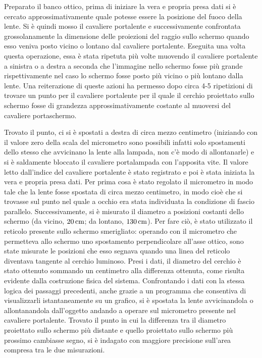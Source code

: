 Preparato il banco 
ottico, prima di iniziare la vera e propria presa dati si è cercato 
approssimativamente quale potesse essere la posizione del fuoco 
della lente. Si è quindi mosso il cavaliere portalente e 
successivamente confrontata grossolanamente la dimensione delle 
proiezioni del raggio sullo schermo quando esso veniva posto vicino 
o lontano dal cavaliere portalente. Eseguita una volta questa 
operazione, essa è stata ripetuta più volte muovendo il cavaliere 
portalente a sinistra o a destra a seconda che l'immagine nello 
schermo fosse più grande rispettivamente nel caso lo schermo fosse 
posto più vicino o più lontano dalla lente. Una reiterazione di 
queste azioni ha permesso dopo circa 4-5 ripetizioni di trovare un 
punto per il cavaliere portalente per il quale il cerchio proiettato 
sullo schermo fosse di grandezza approssimativamente costante al 
muoversi del cavaliere portaschermo. 

Trovato il punto, ci si è spostati a destra di circa mezzo centimetro (iniziando con il 
valore zero della scala del micrometro sono possibili infatti solo 
spostamenti dello stesso che avvicinano la lente alla lampada, non 
c'è modo di allontanarle) e si è saldamente bloccato il cavaliere 
portalampada con l'apposita vite. Il valore letto dall'indice del 
cavaliere portalente è stato registrato e poi è stata iniziata la 
vera e propria presa dati. Per prima cosa è stato regolato il 
micrometro in modo tale che la lente fosse spostata di circa mezzo 
centimetro, in modo cioè che si trovasse sul punto nel quale a 
occhio era stata individuata la condizione di fascio parallelo. 
Successivamente, si è misurato il diametro a posizioni costanti 
dello schermo (da vicino, $20\,\mathrm{cm}$; da lontano, $130\,\mathrm{cm}$). Per fare 
ciò, è stato utilizzato il reticolo presente sullo schermo 
smerigliato: operando con il micrometro che permetteva allo schermo 
uno spostamento perpendicolare all'asse ottico, sono state misurate 
le posizioni che esso segnava quando una linea del reticolo 
diventava tangente al cerchio luminoso. Presi i dati, il diametro 
del cerchio \`e stato ottenuto sommando un centimetro alla 
differenza ottenuta, come risulta evidente dalla costruzione fisica 
del sistema. Confrontando i dati con la stessa logica dei passaggi 
precedenti, anche grazie a un programma che consentiva di 
visualizzarli istantaneamente su un grafico, si è spostata la lente 
avvicinandola o allontanandola dall'oggetto andando a operare sul 
micrometro presente nel cavaliere portalente. Trovato il punto in 
cui la differenza tra il diametro proiettato sullo schermo più 
distante e quello proiettato sullo schermo più prossimo cambiasse 
segno, si è indagato con maggiore precisione sull'area compresa tra 
le due misurazioni.

